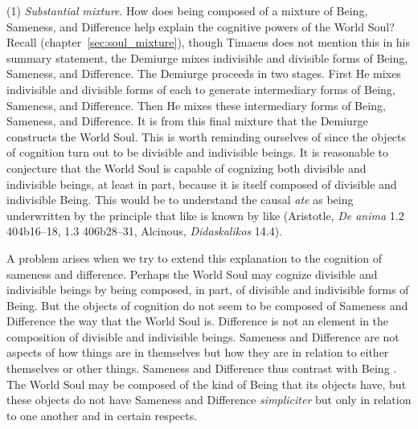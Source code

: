 (1) \emph{Substantial mixture}. How does being composed of a mixture of Being, Sameness, and Difference help explain the cognitive powers of the World Soul? Recall (chapter~\ref{sec:soul_mixture}), though Timaeus does not mention this in his summary statement, the Demiurge mixes indivisible and divisible forms of Being, Sameness, and Difference. The Demiurge proceeds in two stages. First He mixes indivisible and divisible forms of each to generate intermediary forms of Being, Sameness, and Difference. Then He mixes these intermediary forms of Being, Sameness, and Difference. It is from this final mixture that the Demiurge constructs the World Soul. This is worth reminding ourselves of since the objects of cognition turn out to be divisible and indivisible beings. It is reasonable to conjecture that the World Soul is capable of cognizing both divisible and indivisible beings, at least in part, because it is itself composed of divisible and indivisible Being. This would be to understand the causal \emph{ate} as being underwritten by the principle that like is known by like (Aristotle, \emph{De anima} 1.2 404b16–18, 1.3 406b28–31, Alcinous, \emph{Didaskalikos} 14.4).

A problem arises when we try to extend this explanation to the cognition of sameness and difference. Perhaps the World Soul may cognize divisible and indivisible beings by being composed, in part, of divisible and indivisible forms of Being. But the objects of cognition do not seem to be composed of Sameness and Difference the way that the World Soul is. Difference is not an element in the composition of divisible and indivisible beings. Sameness and Difference are not aspects of how things are in themselves but how they are in relation to either themselves or other things. Sameness and Difference thus contrast with Being \citep[58--9]{Corcilius:2018bd}. The World Soul may be composed of the kind of Being that its objects have, but these objects do not have Sameness and Difference \emph{simpliciter} but only in relation to one another and in certain respects.

